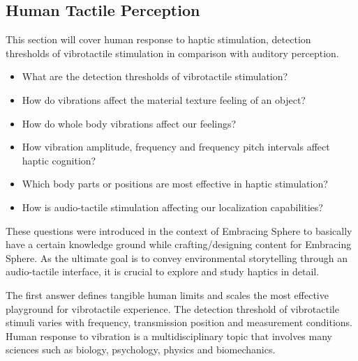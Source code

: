         \subsection{Human Tactile Perception}
            This section will cover human response to haptic stimulation, detection thresholds of vibrotactile stimulation in comparison with auditory perception.\par

            \begin{itemize}
                \item What are the detection thresholds of vibrotactile stimulation?
                \item How do vibrations affect the material texture feeling of an object?
                \item How do whole body vibrations affect our feelings?
                \item How vibration amplitude, frequency and frequency pitch intervals affect haptic cognition?
                \item Which body parts or positions are most effective in haptic stimulation?
                \item How is audio-tactile stimulation affecting our localization capabilities?
            \end{itemize}

            These questions were introduced in the context of Embracing Sphere to basically have a certain knowledge ground while crafting/designing content for Embracing Sphere. As the ultimate goal is to convey environmental storytelling through an audio-tactile interface, it is crucial to explore and study haptics in detail.\par

            The first answer defines tangible human limits and scales the most effective playground for vibrotactile experience. The detection threshold of vibrotactile stimuli varies with frequency, transmission position and measurement conditions. Human response to vibration is a multidisciplinary topic that involves many sciences such as biology, psychology, physics and biomechanics\cite{Human_Response_to_Vibration}.\par

